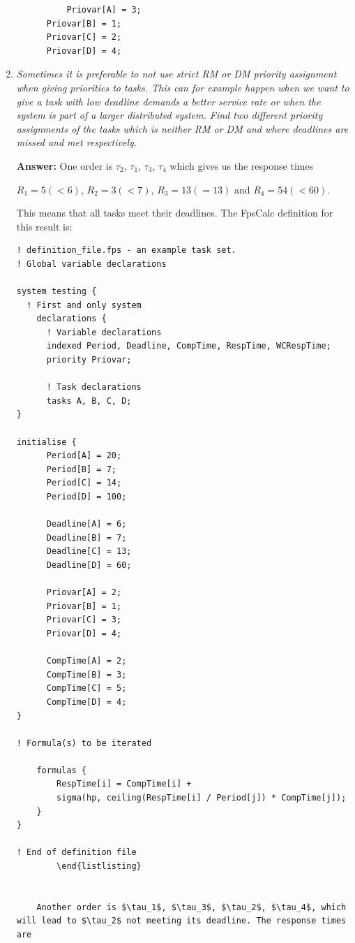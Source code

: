 \documentclass[a4paper,10pt]{article}
\newcommand{\answer}{\textbf{Answer: }}
\begin{document}
\begin{enumerate}
        \begin{lstlisting}
          Priovar[A] = 3;
	  Priovar[B] = 1;
	  Priovar[C] = 2;
	  Priovar[D] = 4;
        \end{lstlisting}

	\item \emph{Sometimes it is preferable to not use strict RM or DM priority assignment when giving priorities to tasks. This can for example happen when we want to give a task with low deadline demands a better service rate or when the system is part of a larger distributed system. Find two different priority assignments of the tasks which is neither RM or DM and where deadlines are missed and met respectively.}
	
	\answer One order is $\tau_2$, $\tau_1$, $\tau_3$, $\tau_4$ which gives us the response times 
	
	$R_1 = 5 (< 6)$, $R_2 = 3 (< 7)$, $R_3 = 13 (= 13)$ and $R_4 = 54 (< 60)$. 
	
	This means that all tasks meet their deadlines. The FpsCalc definition for this result is:

        \begin{lstlisting}
! definition_file.fps - an example task set.
! Global variable declarations

system testing {
  ! First and only system
    declarations {		
      ! Variable declarations
      indexed Period, Deadline, CompTime, RespTime, WCRespTime;
      priority Priovar;	
			      	       
      ! Task declarations
      tasks A, B, C, D;
}

initialise {
	  Period[A] = 20;
	  Period[B] = 7;
	  Period[C] = 14;
	  Period[D] = 100;
	  
	  Deadline[A] = 6;
	  Deadline[B] = 7;
	  Deadline[C] = 13;
	  Deadline[D] = 60;
	  
	  Priovar[A] = 2;
	  Priovar[B] = 1;
	  Priovar[C] = 3;
	  Priovar[D] = 4;
	  
	  CompTime[A] = 2;
	  CompTime[B] = 3;
	  CompTime[C] = 5;
	  CompTime[D] = 4;
}

! Formula(s) to be iterated
  
    formulas {
        RespTime[i] = CompTime[i] +
	    sigma(hp, ceiling(RespTime[i] / Period[j]) * CompTime[j]);
    }
}				   

! End of definition file
        \end{listlisting}

	
	Another order is $\tau_1$, $\tau_3$, $\tau_2$, $\tau_4$, which will lead to $\tau_2$ not meeting its deadline. The response times are
	

\end{lstlisting}
\end{enumerate}
\end{document}
